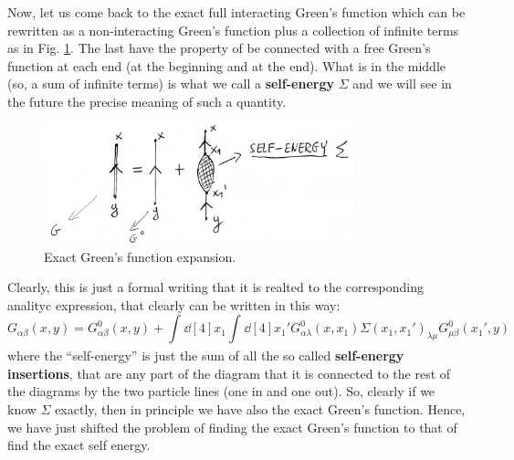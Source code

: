 \documentclass[../main/main.tex]{subfiles}
\begin{document}
Now, let us come back to the exact full interacting Green's function which can be rewritten as a non-interacting Green's function plus a collection of infinite terms as in Fig. \ref{fig:15_4}. The last have the property of be connected with a free Green's function at each end (at the beginning and at the end). What is in the middle (so, a sum of infinite terms) is what we call a \textbf{self-energy} \( \Sigma  \) and we will see in the future the precise meaning of such a quantity.

\begin{figure}[h!]
\centering
\includegraphics[width=0.8\textwidth]{../lessons/15_image/2.png}
\caption{\label{fig:15_4} Exact Green's function expansion.}
\end{figure}

Clearly, this is just a formal writing that it is realted to the corresponding analityc expression, that clearly can be written in this way:
\begin{equation*}
  G_{\alpha \beta } (x,y) =
  G^0_{\alpha \beta } (x,y)
  + \int_{}^{} \dd[4]{x_1} \int_{}^{} \dd[4]{x_1'}
  G^{0}_{\alpha \lambda } (x,x_1) \Sigma (x_1,x_1')_{\lambda \mu }
  G^0_{\mu \beta } (x_1',y)
\end{equation*}
where the “self-energy” is just the sum of all the so called \textbf{self-energy insertions}, that are any part of the diagram that it is connected to the rest of the diagrams by the two particle lines (one in and one out).
So, clearly if we know \( \Sigma  \) exactly, then in principle we have also the exact Green's function. Hence, we have just shifted the problem of finding the exact Green's function to that of find the exact self energy.
\end{document}
